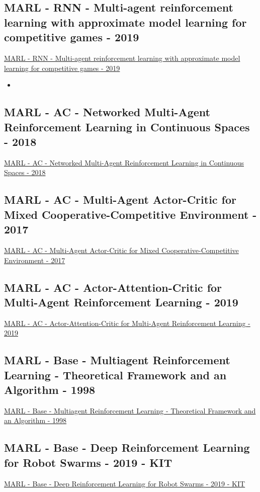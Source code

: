 \subsection{MARL - RNN - Multi-agent reinforcement learning with approximate model learning for competitive games - 2019}
\href{https://journals.plos.org/plosone/article?id=10.1371/journal.pone.0222215}{MARL - RNN - Multi-agent reinforcement learning with approximate model learning for competitive games - 2019}
\begin{itemize}[noitemsep,nolistsep]
	\item 
\end{itemize}

\subsection{MARL - AC - Networked Multi-Agent Reinforcement Learning in Continuous Spaces - 2018}
\href{https://ieeexplore.ieee.org/abstract/document/8619581}{MARL - AC - Networked Multi-Agent Reinforcement Learning in Continuous Spaces - 2018}

\subsection{MARL - AC - Multi-Agent Actor-Critic for Mixed Cooperative-Competitive Environment - 2017}
\href{https://arxiv.org/abs/1706.02275}{MARL - AC - Multi-Agent Actor-Critic for Mixed Cooperative-Competitive Environment - 2017}

\subsection{MARL - AC - Actor-Attention-Critic for Multi-Agent Reinforcement Learning - 2019}
\href{http://proceedings.mlr.press/v97/iqbal19a.html}{MARL - AC - Actor-Attention-Critic for Multi-Agent Reinforcement Learning - 2019}

\subsection{MARL - Base - Multiagent Reinforcement Learning - Theoretical Framework and an Algorithm - 1998}
\href{https://dl.acm.org/doi/abs/10.5555/645527.657296}{MARL - Base - Multiagent Reinforcement Learning - Theoretical Framework and an Algorithm - 1998}

\subsection{MARL - Base - Deep Reinforcement Learning for Robot Swarms - 2019 - KIT}
\href{https://publikationen.bibliothek.kit.edu/1000118251}{MARL - Base - Deep Reinforcement Learning for Robot Swarms - 2019 - KIT}

